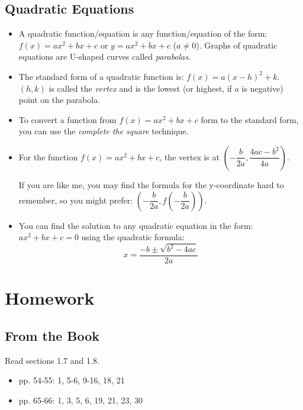 \documentclass[fleqn,addpoints]{exam}
\begin{document}
\subsection{Quadratic Equations}

\begin{itemize}

\item A quadratic function/equation is any function/equation of the form: $f(x) = ax^2 + bx + c$ or $y = ax^2 + bx + c$ ($a \neq 0$).  Graphs of
  quadratic equations are U-shaped curves called {\em parabolas}.

\item The standard form of a quadratic function is: $f(x) = a(x-h)^2 + k$.  $(h, k)$ is called the {\em vertex} and is the
  lowest (or highest, if $a$ is negative) point on the parabola.

\item To convert a function from $f(x) = ax^2+bx+c$ form to the standard form, you can use the {\em complete the square} technique.

\item For the function $f(x) = ax^2+bx+c$, the vertex is at $\left( -\dfrac{b}{2a}, \dfrac{4ac - b^2}{4a} \right)$.  

  If you are like me, you may find the formula for the y-coordinate hard to remember, so you might prefer: 
  $\left( - \dfrac{b}{2a}, f \left(- \dfrac{b}{2a} \right) \right)$.

\item You can find the solution to any quadratic equation in the form: $ax^2+bx+c=0$ using the quadratic formula:
\[
  x = \frac{-b \pm \sqrt{b^2-4ac}}{2a}
\]

\end{itemize}
\pagebreak

\fi

\section{Homework}

\subsection{From the Book}

Read sections 1.7 and 1.8.
 
\begin{itemize}
  \item pp. 54-55: 1, 5-6, 9-16, 18, 21
  \item pp. 65-66: 1, 3, 5, 6, 19, 21, 23, 30
\end{itemize}
\end{document}
